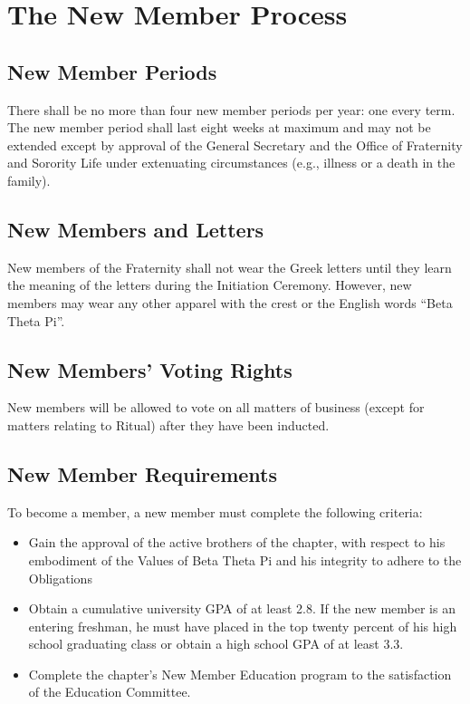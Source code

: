 \chapter{The New Member Process}
\label{cha:the-new-member-process}

\section{New Member Periods}

There shall be no more than four new member periods per year: one every term.
The new member period shall last eight weeks at maximum and may not be extended
except by approval of the General Secretary and the Office of Fraternity and
Sorority Life under extenuating circumstances (e.g., illness or a death in the
family).

\section{New Members and Letters}

New members of the Fraternity shall not wear the Greek letters until they learn
the meaning of the letters during the Initiation Ceremony.
However, new members may wear any other apparel with the crest or the English
words “Beta Theta Pi”.

\section{New Members' Voting Rights}

New members will be allowed to vote on all matters of business (except for
matters relating to Ritual) after they have been inducted.

\section{New Member Requirements}

To become a member, a new member must complete the following criteria:
\begin{itemize}
    \item Gain the approval of the active brothers of the chapter, with respect
        to his embodiment of the Values of Beta Theta Pi and his integrity to
        adhere to the Obligations
    \item Obtain a cumulative university GPA of at least 2.8. If the new member
        is an entering freshman, he must have placed in the top twenty percent
        of his high school graduating class or obtain a high school GPA of at
        least 3.3.
    \item Complete the chapter’s New Member Education program to the
        satisfaction of the Education Committee.
\end{itemize}

